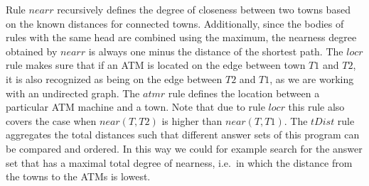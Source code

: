 \documentclass{tlp}
\begin{document}
Rule $nearr$ recursively defines the degree of closeness between two towns based on the known distances for connected towns.  Additionally, since the bodies of rules with the same head are combined using the maximum, the nearness degree obtained by $nearr$ is always one minus the distance of the shortest path. The $locr$ rule makes sure that if an ATM is located on the edge between town $T1$ and $T2$, it is also recognized as being on the edge between $T2$ and $T1$, as we are working with an undirected graph. The $atmr$ rule defines the location between a particular ATM machine and a town. Note that due to rule $locr$ this rule also covers the case when $near(T,T2)$ is higher than $near(T,T1)$. The $tDist$ rule aggregates the total distances such that different answer sets of this program can be compared and ordered. In this way we could for example search for the answer set that has a maximal total degree of nearness, i.e.~in which the distance from the towns to the ATMs is lowest.
\end{document}
